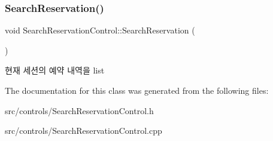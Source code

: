 \subsubsection{\texorpdfstring{Search\+Reservation()}{SearchReservation()}}
{\footnotesize\ttfamily void Search\+Reservation\+Control\+::\+Search\+Reservation (\begin{DoxyParamCaption}{ }\end{DoxyParamCaption})}

현재 세션의 예약 내역을 list 

The documentation for this class was generated from the following files\+:\begin{DoxyCompactItemize}
\item 
src/controls/Search\+Reservation\+Control.\+h\item 
src/controls/Search\+Reservation\+Control.\+cpp\end{DoxyCompactItemize}
